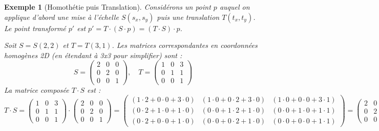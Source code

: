 \documentclass{article}
\newtheorem{example}{Exemple}
\begin{document}
\begin{example}[Homothétie puis Translation]
Considérons un point $p$ auquel on applique d'abord une mise à l'échelle $S(s_x, s_y)$ puis une translation $T(t_x, t_y)$. Le point transformé $p'$ est $p' = T \cdot (S \cdot p) = (T \cdot S) \cdot p$.

Soit $S = S(2,2)$ et $T = T(3,1)$. Les matrices correspondantes en coordonnées homogènes 2D (en étendant à 3x3 pour simplifier) sont :
\[
S = \begin{pmatrix} 2 & 0 & 0 \\ 0 & 2 & 0 \\ 0 & 0 & 1 \end{pmatrix}, \quad
T = \begin{pmatrix} 1 & 0 & 3 \\ 0 & 1 & 1 \\ 0 & 0 & 1 \end{pmatrix}
\]
La matrice composée $T \cdot S$ est :
\[
T \cdot S = \begin{pmatrix} 1 & 0 & 3 \\ 0 & 1 & 1 \\ 0 & 0 & 1 \end{pmatrix} \cdot
            \begin{pmatrix} 2 & 0 & 0 \\ 0 & 2 & 0 \\ 0 & 0 & 1 \end{pmatrix} =
            \begin{pmatrix} (1\cdot2+0\cdot0+3\cdot0) & (1\cdot0+0\cdot2+3\cdot0) & (1\cdot0+0\cdot0+3\cdot1) \\
                            (0\cdot2+1\cdot0+1\cdot0) & (0\cdot0+1\cdot2+1\cdot0) & (0\cdot0+1\cdot0+1\cdot1) \\
                            (0\cdot2+0\cdot0+1\cdot0) & (0\cdot0+0\cdot2+1\cdot0) & (0\cdot0+0\cdot0+1\cdot1) \end{pmatrix} =
            \begin{pmatrix} 2 & 0 & 3 \\ 0 & 2 & 1 \\ 0 & 0 & 1 \end{pmatrix}
\]


\end{example}
\end{document}
